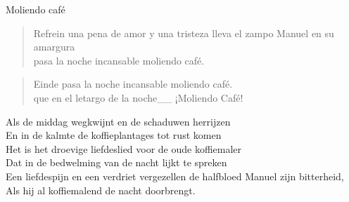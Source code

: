 \begin{song}[tropical]{Moliendo café}
\begin{verse}{Refrein}
una pena de amor y una tristeza lleva el zampo Manuel en su amargura\\
pasa la noche incansable moliendo café.\hspace{1em}\chord{$\downarrow\downarrow$}\hspace{1.5em}\chord{$\downarrow\downarrow$}
\end{verse}

\begin{verse}{Einde}
pasa la noche incansable moliendo café.\hspace{1em}\chord{$\downarrow\downarrow$}\hspace{1.5em}\chord{$\downarrow\downarrow$}\\
que en el letargo de la noche\_\_ ¡Moliendo Café!
\end{verse}
\end{song}

\clearpage
\begin{translation}
Als de middag wegkwijnt en de schaduwen herrijzen\\
En in de kalmte de koffieplantages tot rust komen\\
Het is het droevige liefdeslied voor de oude koffiemaler\\
Dat in de bedwelming van de nacht lijkt te spreken\\
\vspace{1em}
Een liefdespijn en een verdriet vergezellen de halfbloed Manuel zijn bitterheid,\\
Als hij al koffiemalend de nacht doorbrengt.\\
\end{translation}
